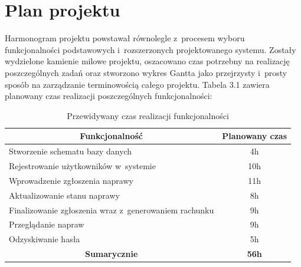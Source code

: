 \documentclass[a4paper,11pt]{article}
\begin{document}
\section{Plan projektu}
Harmonogram projektu powstawał równolegle z~procesem wyboru funkcjonalności podstawowych i~rozszerzonych projektowanego systemu. Zostały wydzielone kamienie milowe projektu, oszacowano czas potrzebny na realizację poszczególnych zadań oraz stworzono wykres Gantta jako przejrzysty i~prosty sposób na zarządzanie terminowością całego projektu.
Tabela 3.1 zawiera planowany czas realizacji poszczególnych funkcjonalności:
\begin{table}[H]
	\centering
	\caption{Przewidywany czas realizacji funkcjonalności}
	\bgroup
\begin{tabular}{|l|c|}
	\hline
	\multicolumn{1}{|c|}{\textbf{Funkcjonalność}} & \textbf{Planowany czas} \\ \hline \hline
	 Stworzenie schematu bazy danych & 4h \\ \hline
	 Rejestrowanie użytkowników w~systemie & 10h \\ \hline
	 Wprowadzenie zgłoszenia naprawy & 11h \\ \hline
	 Aktualizowanie stanu naprawy & 8h \\ \hline
	 Finalizowanie zgłoszenia wraz z~generowaniem rachunku & 9h \\ \hline
	 Przeglądanie napraw & 9h \\ \hline
	 Odzyskiwanie hasła & 5h \\ \hline \hline
	 \multicolumn{1}{|c|}{\textbf{Sumarycznie}} & \textbf{56h} \\ \hline
\end{tabular}
\egroup
\end{table}
\end{document}

